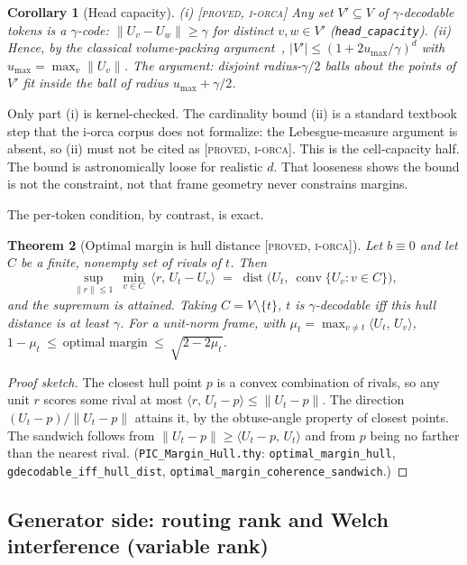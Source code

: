 \documentclass[11pt]{article}
\theoremstyle{definition}
\theoremstyle{plain}
\newtheorem{theorem}{Theorem}[section]
\newtheorem{corollary}[theorem]{Corollary}
\theoremstyle{remark}
\newcommand{\proved}{\textsc{[proved, i-orca]}}
\newcommand{\inner}[2]{\langle #1,\, #2\rangle}
\newcommand{\umax}{u_{\max}}
\begin{document}
\begin{corollary}[Head capacity]\label{cor:cap}
\textup{(i)} \proved{} Any set $V'\subseteq V$ of $\gamma$-decodable tokens is a $\gamma$-code:
$\lVert U_v-U_w\rVert\ge\gamma$ for distinct $v,w\in V'$ (\texttt{head\_capacity}).
\textup{(ii)} Hence, by the classical volume-packing argument~\cite[\S4.2]{vershynin2018high}, $|V'|\le(1+2\umax/\gamma)^d$ with
$\umax=\max_v\lVert U_v\rVert$. The argument: disjoint radius-$\gamma/2$ balls about the points of $V'$
fit inside the ball of radius $\umax+\gamma/2$.
\end{corollary}

\noindent Only part (i) is kernel-checked. The cardinality bound (ii) is a standard textbook step that the
i-orca corpus does not formalize: the Lebesgue-measure argument is absent, so (ii) must not be cited as
\proved{}. This is the cell-capacity half. The bound is astronomically loose for realistic $d$. That
looseness shows the bound is not the constraint, not that frame geometry never constrains margins.

The per-token condition, by contrast, is exact.

\begin{theorem}[Optimal margin is hull distance \proved{}]\label{thm:hull}
Let $b\equiv0$ and let $C$ be a finite, nonempty set of rivals of $t$. Then
\[
  \sup_{\lVert r\rVert\le1}\ \min_{v\in C}\ \inner{r}{U_t-U_v}
  \;=\; \operatorname{dist}\bigl(U_t,\ \operatorname{conv}\{U_v: v\in C\}\bigr),
\]
and the supremum is attained. Taking $C=V\setminus\{t\}$, $t$ is $\gamma$-decodable iff this hull distance is at
least $\gamma$. For a
unit-norm frame, with $\mu_t=\max_{v\neq t}\inner{U_t}{U_v}$,
$1-\mu_t\ \le\ \text{optimal margin}\ \le\ \sqrt{2-2\mu_t}$.
\end{theorem}
\begin{proof}[Proof sketch]
The closest hull point $p$ is a convex combination of rivals, so any unit $r$ scores some rival at most
$\inner{r}{U_t-p}\le\lVert U_t-p\rVert$. The direction $(U_t-p)/\lVert U_t-p\rVert$ attains it, by the
obtuse-angle property of closest points. The sandwich follows from $\lVert U_t-p\rVert\ge\inner{U_t-p}{U_t}$ and
from $p$ being no farther than the nearest rival. (\texttt{PIC\_Margin\_Hull.thy}:
\texttt{optimal\_margin\_hull}, \texttt{gdecodable\_iff\_hull\_dist},
\texttt{optimal\_margin\_coherence\_sandwich}.)
\end{proof}

\subsection{Generator side: routing rank and Welch interference (variable rank)}
\end{document}
